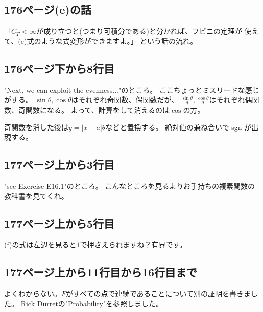   \subsection{176ページ(e)の話}
    「$C_T < \infty$が成り立つと(つまり可積分である)と分かれば、フビニの定理が
    使えて、(e)式のような式変形ができますよ。」
    という話の流れ。

  \subsection{176ページ下から8行目}
    "Next, we can exploit the evenness..."のところ。
    ここちょっとミスリードな感じがする。
    $\sin \theta ,\cos \theta$はそれぞれ奇関数、偶関数だが、
    $\displaystyle{\frac{\sin\theta}{\theta}, \frac{\cos\theta}{\theta}}$はそれぞれ偶関数、奇関数になる。
    よって、計算をして消えるのは$\cos$の方。

    奇関数を消した後は$y = |x-a|\theta$などと置換する。
    絶対値の兼ね合いで sgn が出現する。

  \subsection{177ページ上から3行目}
    "see Exercise E16.1"のところ。
    こんなところを見るよりお手持ちの複素関数の教科書を見てくれ。

  \subsection{177ページ上から5行目}
    (f)の式は左辺を見ると$1$で押さえられますね？有界です。

  \subsection{177ページ上から11行目から16行目まで}
    よくわからない。$F$がすべての点で連続であることについて別の証明を書きました。
    Rick Durretの"Probability"を参照しました。

